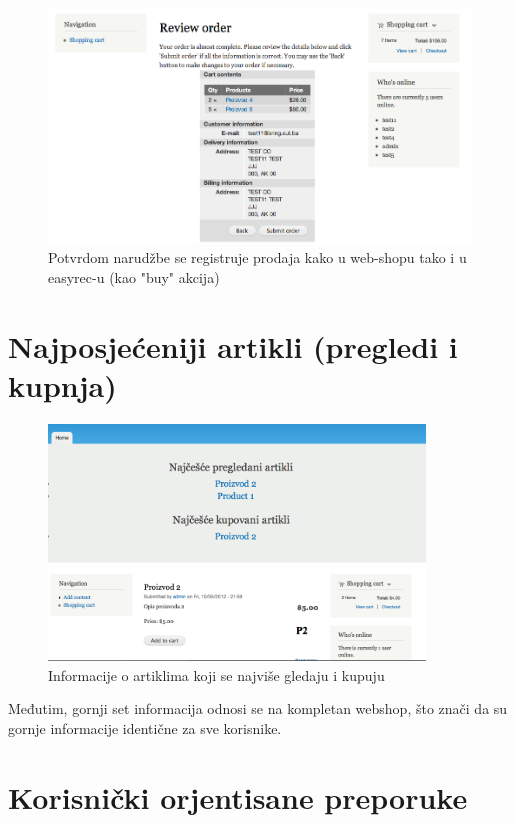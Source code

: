 \documentclass[times, utf8, seminar]{fit}
\begin{document}
{{\begin{figure}[H]
\centering
\includegraphics[width=14cm]{img/review_order.png}
\caption{Potvrdom narudžbe se registruje prodaja kako u web-shopu tako i u easyrec-u (kao "buy" akcija)}
\end{figure}

\section{Najposjećeniji artikli (pregledi i kupnja)}

\begin{figure}[H]
\centering
\includegraphics[width=10cm]{img/pregled_rezultata_preporuke.png}
\caption{Informacije o artiklima koji se najviše gledaju i kupuju}
\end{figure}

Međutim, gornji set informacija odnosi se na kompletan webshop, što znači da su gornje informacije identične za sve korisnike.

\section{Korisnički orjentisane preporuke}

}}
\end{document}
